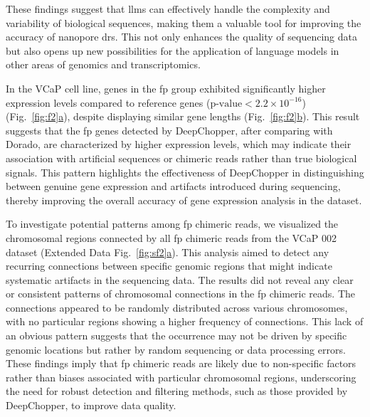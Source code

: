 \documentclass[pdflatex, sn-mathphys-num, lineno]{sn-jnl}%
\newcommand{\figref}[2]{Fig.~\hyperref[#1]{\ref*{#1}#2}}
\newcommand{\edfigref}[2]{Extended Data Fig.~\hyperref[#1]{\ref*{#1}#2}}
\theoremstyle{thmstyleone}%
\theoremstyle{thmstyletwo}%
\theoremstyle{thmstylethree}%
\begin{document}
These findings suggest that \glspl{llm} can effectively handle the complexity and variability of biological sequences, making them a valuable tool for improving the accuracy of nanopore \gls{drs}.
This not only enhances the quality of sequencing data but also opens up new possibilities for the application of language models in other areas of genomics and transcriptomics.

In the VCaP cell line, genes in the \gls{fp} group exhibited significantly higher expression levels compared to reference genes (\(\textrm{p-value} < 2.2 \times 10^{-16}\)) (\figref{fig:f2}{a}), despite displaying similar gene lengths (\figref{fig:f2}{b}).
This result suggests that the \gls{fp} genes detected by DeepChopper, after comparing with Dorado, are characterized by higher expression levels, which may indicate their association with artificial sequences or chimeric reads rather than true biological signals.
This pattern highlights the effectiveness of DeepChopper in distinguishing between genuine gene expression and artifacts introduced during sequencing, thereby improving the overall accuracy of gene expression analysis in the dataset.


To investigate potential patterns among \gls{fp} chimeric reads, we visualized the chromosomal regions connected by all \gls{fp} chimeric reads from the VCaP 002 dataset (\edfigref{fig:sf2}{a}).
This analysis aimed to detect any recurring connections between specific genomic regions that might indicate systematic artifacts in the sequencing data.
The results did not reveal any clear or consistent patterns of chromosomal connections in the \gls{fp} chimeric reads.
The connections appeared to be randomly distributed across various chromosomes, with no particular regions showing a higher frequency of connections.
This lack of an obvious pattern suggests that the occurrence may not be driven by specific genomic locations but rather by random sequencing or data processing errors.
These findings imply that \gls{fp} chimeric reads are likely due to non-specific factors rather than biases associated with particular chromosomal regions, underscoring the need for robust detection and filtering methods, such as those provided by DeepChopper, to improve data quality.
\end{document}
